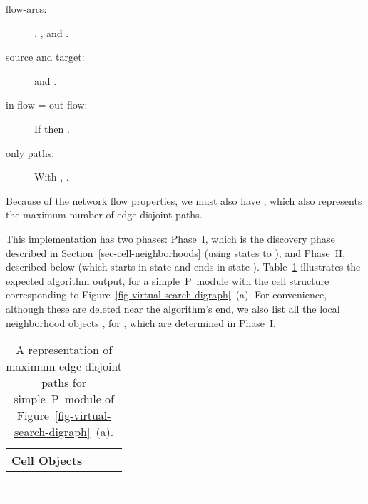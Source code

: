 \documentclass[preliminary,copyright,creativecommons]{eptcs}
\theoremstyle{remark}
\begin{document}
\begin{minipage}{5.5in}
\begin{description}
\item[flow-arcs:] 
     , , 
      and 
     .
\item[source and target:] 
      and .
\item[in flow = out flow:] If  then . 
\item[only paths:] 
With ,
.

\end{description}
\end{minipage}

\smallskip

\noindent Because of the network flow properties, we must also have ,
which also represents the maximum number of edge-disjoint paths.

This implementation has two phases: Phase~I, which is the discovery phase
described in Section~\ref{sec-cell-neighborhoods} (using states  to ), 
and Phase~II, described below (which starts in state  and ends in state ).
Table~\ref{tab-edge-output-objects} illustrates
the expected algorithm output, for a simple~P~module with the cell structure
corresponding to Figure~\ref{fig-virtual-search-digraph}~(a).
For convenience, although these are deleted near the algorithm's end,
we also list all the local neighborhood objects 
, for , 
which are determined in Phase~I.

\setcounter{table}{\thefigure}
\begin{table}[ht]
\caption{A representation of maximum edge-disjoint paths for simple~P~module of
Figure~\ref{fig-virtual-search-digraph}~(a).}
\label{tab-edge-output-objects}
\begin{center}
\begin{tabular}{ | c | c | c | c | } \hline
Cell  Objects &  &  &  \\ \hline 
 &  &  &  \\ \hline
 &  &  &  \\ \hline
 &  &  &  \\ \hline
 &  &  &  \\ \hline
 &  &  &  \\ \hline
 &  &  &  \\ \hline
\end{tabular}
\end{center}
\end{table}
\addtocounter{figure}{1}
\end{document}
